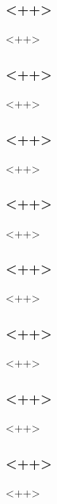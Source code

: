 \begin{frame}[fragile]
\frametitle{<++>}
<++>
\end{frame}

\begin{frame}[fragile]
\frametitle{<++>}
<++>
\end{frame}

\begin{frame}[fragile]
\frametitle{<++>}
<++>
\end{frame}

\begin{frame}[fragile]
\frametitle{<++>}
<++>
\end{frame}

\begin{frame}[fragile]
\frametitle{<++>}
<++>
\end{frame}

\begin{frame}[fragile]
\frametitle{<++>}
<++>
\end{frame}

\begin{frame}[fragile]
\frametitle{<++>}
<++>
\end{frame}

\begin{frame}[fragile]
\frametitle{<++>}
<++>
\end{frame}




